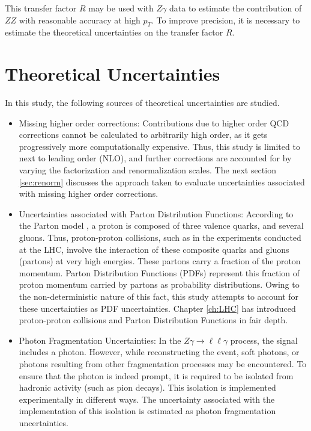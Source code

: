 \documentclass[11pt,a4paper,openright,twoside]{report}
\newcommand{\Zg}{$Z\gamma\to \ell\ell\gamma$ }
\begin{document}
This transfer factor $R$ may be used with $Z\gamma$ data to estimate the contribution of $ZZ$ with reasonable accuracy at high $p_T$. To improve precision, it is necessary to estimate the theoretical uncertainties on the transfer factor $R$.

\section{Theoretical Uncertainties}
In this study, the following sources of theoretical uncertainties are studied.
\begin{itemize}
\item Missing higher order corrections: Contributions due to higher order QCD corrections cannot be calculated to arbitrarily high order, as it gets progressively more computationally expensive. Thus, this study is limited to next to leading order (NLO), and further corrections are accounted for by varying the factorization and renormalization scales. The next section \ref{sec:renorm} discusses the approach taken to evaluate uncertainties associated with missing higher order corrections.

\item Uncertainties associated with Parton Distribution Functions: According to the Parton model \cite{parton_model}, a proton is composed of three valence quarks, and several gluons. Thus, proton-proton collisions, such as in the experiments conducted at the LHC, involve the interaction of these composite quarks and gluons (partons) at very high energies. These partons carry a fraction of the proton momentum. Parton Distribution Functions (PDFs) represent this fraction of proton momentum carried by partons as probability distributions. Owing to the non-deterministic nature of this fact, this study attempts to account for these uncertainties as PDF uncertainties. Chapter \ref{ch:LHC} has introduced proton-proton collisions and Parton Distribution Functions in fair depth.

\item Photon Fragmentation Uncertainties: In the \Zg process, the signal includes a photon. However, while reconstructing the event, soft photons, or photons resulting from other fragmentation processes may be encountered. To ensure that the photon is indeed prompt, it is required to be isolated from hadronic activity (such as pion decays). This isolation is implemented experimentally in different ways. The uncertainty associated with the implementation of this isolation is estimated as photon fragmentation uncertainties.
\end{itemize}
\end{document}
